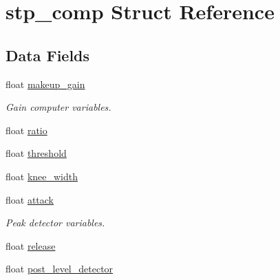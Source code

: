 \hypertarget{structstp__comp}{}\section{stp\+\_\+comp Struct Reference}
\label{structstp__comp}
\subsection*{Data Fields}
\begin{DoxyCompactItemize}
\item 
\mbox{\label{structstp__comp_a192e85a07da4c38529ba73e019a6f597}} 
float \mbox{\hyperlink{structstp__comp_a192e85a07da4c38529ba73e019a6f597}{makeup\+\_\+gain}}
\begin{DoxyCompactList}\small\item\em Gain computer variables. \end{DoxyCompactList}\item 
float \mbox{\hyperlink{structstp__comp_a207ad05f99cc72068a92358861ff5e71}{ratio}}
\item 
float \mbox{\hyperlink{structstp__comp_a376acef8954eadc70f4b55e8e0588e13}{threshold}}
\item 
float \mbox{\hyperlink{structstp__comp_a177e7480fe81136c83715e274f5600d9}{knee\+\_\+width}}
\item 
\mbox{\label{structstp__comp_a6debdaced8e960a83625dc7bbbec4b3e}} 
float \mbox{\hyperlink{structstp__comp_a6debdaced8e960a83625dc7bbbec4b3e}{attack}}
\begin{DoxyCompactList}\small\item\em Peak detector variables. \end{DoxyCompactList}\item 
float \mbox{\hyperlink{structstp__comp_a3dee5c7240d1c7d471a78f3457342ec7}{release}}
\item 
float \mbox{\hyperlink{structstp__comp_a8471668a5e9d7dea04b4e891eb186edf}{post\+\_\+level\+\_\+detector}}
\end{DoxyCompactItemize}
